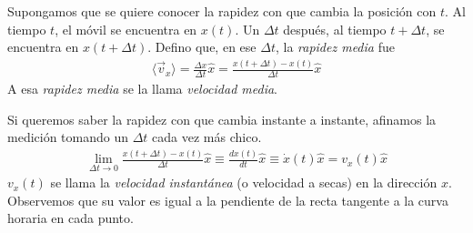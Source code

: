 Supongamos que se quiere conocer la rapidez con que cambia la posición con $t$.
Al tiempo $t$, el móvil se encuentra en $x(t)$. Un $\Delta t$ después, al tiempo $t+\Delta t$, se encuentra en 
$x(t+\Delta t)$. Defino que, en ese $\Delta t$, la \textit{rapidez media} fue
\begin{align*}
  \langle \vec{v}_x\rangle =\frac{\Delta x}{\Delta t}\hat{x}=\frac{x(t+\Delta t)- x(t)}{\Delta t} \hat{x}
\end{align*}
A esa \textit{rapidez media} se la llama \textit{velocidad media}.

\para
Si queremos saber la rapidez con que cambia instante a instante, afinamos la medición tomando un $\Delta t$ cada vez más 
chico.
\begin{align*}
  \lim\limits_{\Delta t \rightarrow 0}\displaystyle\frac{x(t+\Delta t)- x(t)}{\Delta t} \hat{x}\equiv 
  \frac{dx(t)}{dt}\hat{x}\equiv\dot{x}(t)\hat{x}=v_{x}(t)\hat{x}
\end{align*}
$v_{x}(t)$ se llama la \textit{velocidad instantánea} (o velocidad a secas) en la dirección $x$. Observemos que su valor 
es igual a la pendiente de la recta tangente a la curva horaria en cada punto. 

